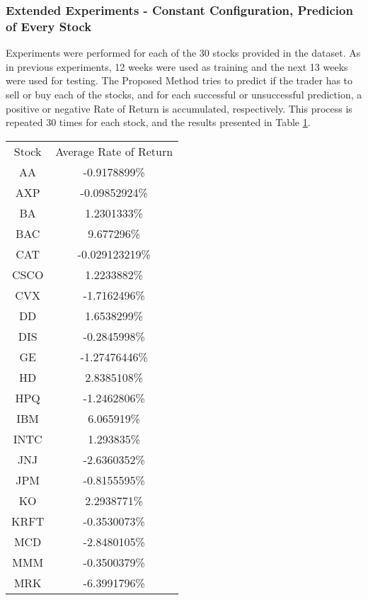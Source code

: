 \subsubsection{Extended Experiments - Constant Configuration, Predicion of Every Stock}

Experiments were performed for each of the 30 stocks provided in the dataset. As in previous experiments, 12 weeks were used as training and the next 13 weeks were used for testing. The Proposed Method tries to predict if the trader has to sell or buy each of the stocks, and for each successful or unsuccessful prediction, a positive or negative Rate of Return is accumulated, respectively. This process is repeated 30 times for each stock, and the results presented in Table \ref{avg-rates-of-return-table}.

\begin{table} 
    \label{avg-rates-of-return-table}
    \begin{tabular}{ c c }
        Stock & Average Rate of Return \\ 
        AA & -0.9178899\% \\ %
        AXP & -0.09852924\% \\ %
        BA & 1.2301333\% \\ %
        BAC & 9.677296\% \\ %
        CAT & -0.029123219\% \\ %
        CSCO & 1.2233882\% \\ %
        CVX & -1.7162496\% \\ %
        DD & 1.6538299\% \\ %
        DIS & -0.2845998\% \\ %
        GE & -1.27476446\% \\ %
        HD & 2.8385108\% \\ %
        HPQ & -1.2462806\% \\ %
        IBM & 6.065919\% \\ %
        INTC & 1.293835\% \\ %
        JNJ & -2.6360352\% \\ %
        JPM & -0.8155595\% \\ %
        KO & 2.2938771\% \\ %
        KRFT & -0.3530073\% \\ %
        MCD & -2.8480105\% \\ %
        MMM & -0.3500379\% \\ %
        MRK & -6.3991796\% \\ %

\end{tabular}
\end{table}
